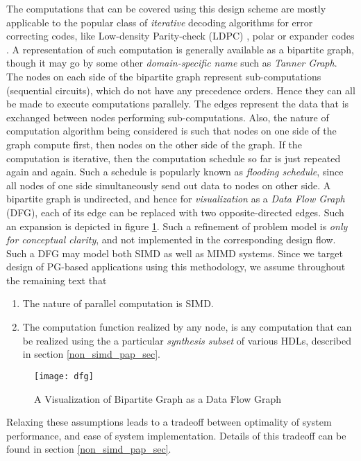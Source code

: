 \documentclass[12pt]{article}
\begin{document}
The computations that can be covered using this design scheme are mostly
applicable to the popular class of \textit{iterative} decoding algorithms
for error correcting codes, like Low-density Parity-check (LDPC) \cite{ldpc_survey}, polar
\cite{polar_pap} or expander codes \cite{sipspiel}. A representation
of such computation is generally available as a bipartite graph, though
it may go by some other \textit{domain-specific
name} such as \textit{Tanner Graph}. The nodes on each side of the bipartite graph
represent sub-computations (sequential circuits), which do not have any precedence orders. Hence
they can all be made to execute computations parallely. The
edges represent the data that is exchanged between nodes performing
sub-computations. Also, the nature of computation algorithm being
considered is such
that nodes on one side of the graph compute first, then nodes on the other
side of the graph. If the computation is iterative, then the computation
schedule so far is just repeated again and again. Such a schedule is
popularly known as \textit{flooding schedule}, since all nodes of
one side simultaneously send out data to nodes on other side. A bipartite graph is
undirected, and hence for \textit{visualization} as a \textit{Data Flow
Graph}\,(DFG), each of its 
edge can be replaced with two opposite-directed edges. Such an expansion is depicted in
figure \ref{dfg_fig}. Such a
refinement of problem model is \textit{only for conceptual clarity}, and not implemented in the
corresponding design flow. 
        Such a DFG may model both SIMD as well as MIMD
systems. Since we target design of PG-based applications using
this methodology, we assume throughout the remaining text that
\begin{enumerate}
\item The nature of parallel computation is SIMD.
\item The computation function realized by any node, is any computation
that can be realized using the a particular \textit{synthesis
subset} of various HDLs, described in section \ref{non_simd_pap_sec}.
\end{enumerate}

\begin{figure}[h]
\begin{center}
\texttt{[image: dfg]}
\end{center}
\caption{A Visualization of Bipartite Graph as a Data Flow Graph}
\label{dfg_fig}
\end{figure}

Relaxing these assumptions leads to a tradeoff between optimality of system
performance, and ease of system implementation. Details of this tradeoff
can be found in section \ref{non_simd_pap_sec}.
\end{document}
